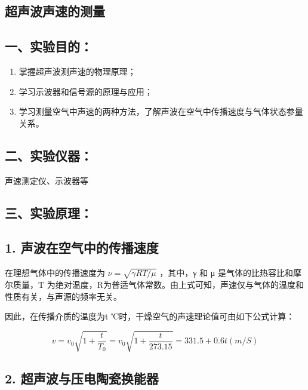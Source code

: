 \documentclass[
  10
]{article}
\author{}
\date{}
\begin{document}
\subsection{超声波声速的测量}\label{ux8d85ux58f0ux6ce2ux58f0ux901fux7684ux6d4bux91cf}

\subsection{一、实验目的：}\label{ux4e00ux5b9eux9a8cux76eeux7684}

\begin{enumerate}
\def\labelenumi{\arabic{enumi}.}
\item
  掌握超声波测声速的物理原理；
\item
  学习示波器和信号源的原理与应用；
\item
  学习测量空气中声速的两种方法，了解声波在空气中传播速度与气体状态参量关系。
\end{enumerate}

\subsection{二、实验仪器：}\label{ux4e8cux5b9eux9a8cux4eeaux5668}

声速测定仪、示波器等

\subsection{三、实验原理：}\label{ux4e09ux5b9eux9a8cux539fux7406}

\subsection{1.
声波在空气中的传播速度}\label{ux58f0ux6ce2ux5728ux7a7aux6c14ux4e2dux7684ux4f20ux64adux901fux5ea6}

在理想气体中的传播速度为 \(\nu = \sqrt { \gamma R T / \mu }\) ，其中，γ
和 μ 是气体的比热容比和摩尔质量，T
为绝对温度，R为普适气体常数。由上式可知，声速仅与气体的温度和性质有关，与声源的频率无关。

因此，在传播介质的温度为t ℃时，干燥空气的声速理论值可由如下公式计算：

\[
v = v _ {0} \sqrt {1 + \frac {t}{T _ {0}}} = v _ {0} \sqrt {1 + \frac {t}{2 7 3 . 1 5}} = 3 3 1. 5 + 0. 6 t (m / S)
\]

\subsection{2.
超声波与压电陶瓷换能器}\label{ux8d85ux58f0ux6ce2ux4e0eux538bux7535ux9676ux74f7ux6362ux80fdux5668}
\end{document}
